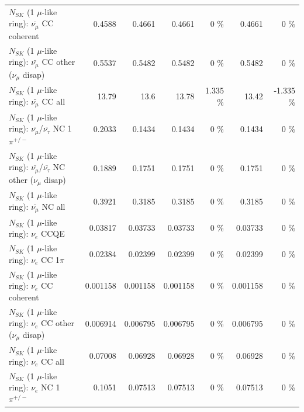 \begin{table}
\begin{tabular}{| l | r | r | r  r | r  r |}
                       $N_{SK}$ (1 $\mu$-like ring): $\bar{\nu_\mu}$ CC coherent &          0.4588 &          0.4661 &          0.4661 &        0 \%  &          0.4661 &        0 \%  \\ 
        $N_{SK}$ (1 $\mu$-like ring): $\bar{\nu_\mu}$ CC other ($\nu_\mu$ disap) &          0.5537 &          0.5482 &          0.5482 &        0 \%  &          0.5482 &        0 \%  \\ 
                          $N_{SK}$ (1 $\mu$-like ring): $\bar{\nu_{\mu}}$ CC all &           13.79 &            13.6 &           13.78 &    1.335 \%  &           13.42 &   -1.335 \%  \\ 
\hline
  $N_{SK}$ (1 $\mu$-like ring): $\bar{\nu_\mu}$/$\bar{\nu_\tau}$ NC 1$\pi^{+/-}$ &          0.2033 &          0.1434 &          0.1434 &        0 \%  &          0.1434 &        0 \%  \\ 
$N_{SK}$ (1 $\mu$-like ring): $\bar{\nu_\mu}$/$\bar{\nu_\tau}$ NC other ($\nu_\mu$ disap) &          0.1889 &          0.1751 &          0.1751 &        0 \%  &          0.1751 &        0 \%  \\ 
                          $N_{SK}$ (1 $\mu$-like ring): $\bar{\nu_{\mu}}$ NC all &          0.3921 &          0.3185 &          0.3185 &        0 \%  &          0.3185 &        0 \%  \\ 
\hline
\hline
\hline
                                      $N_{SK}$ (1 $\mu$-like ring): $\nu_e$ CCQE &         0.03817 &         0.03733 &         0.03733 &        0 \%  &         0.03733 &        0 \%  \\ 
                                 $N_{SK}$ (1 $\mu$-like ring): $\nu_e$ CC 1$\pi$ &         0.02384 &         0.02399 &         0.02399 &        0 \%  &         0.02399 &        0 \%  \\ 
                               $N_{SK}$ (1 $\mu$-like ring): $\nu_e$ CC coherent &        0.001158 &        0.001158 &        0.001158 &        0 \%  &        0.001158 &        0 \%  \\ 
                $N_{SK}$ (1 $\mu$-like ring): $\nu_e$ CC other ($\nu_\mu$ disap) &        0.006914 &        0.006795 &        0.006795 &        0 \%  &        0.006795 &        0 \%  \\ 
                                  $N_{SK}$ (1 $\mu$-like ring): $\nu_{e}$ CC all &         0.07008 &         0.06928 &         0.06928 &        0 \%  &         0.06928 &        0 \%  \\ 
\hline
                           $N_{SK}$ (1 $\mu$-like ring): $\nu_e$ NC 1$\pi^{+/-}$ &          0.1051 &         0.07513 &         0.07513 &        0 \%  &         0.07513 &        0 \%  \\ 

\end{tabular}
\end{table}
